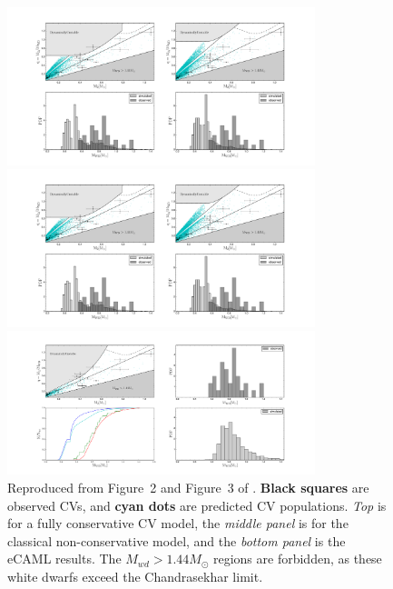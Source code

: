 \begin{figure}
    \centering
    \begin{minipage}[b]{\textwidth}
        \centering
        \includegraphics[width=0.8\textwidth,trim={22cm 12cm 0 0},clip]{figures/introduction/Schrieber_figure1.pdf}
    \end{minipage}
    \begin{minipage}[b]{\textwidth}
        \centering
        \includegraphics[width=0.8\textwidth,trim={0 12cm 22cm 0},clip]{figures/introduction/Schrieber_figure1.pdf}
    \end{minipage}
    \begin{minipage}[b]{\textwidth}
        \centering
        \includegraphics[width=0.8\textwidth,trim={0 11.5cm 24cm 0},clip]{figures/introduction/Schrieber_figure2.pdf}
    \end{minipage}
    \caption{Reproduced from Figure~2 and Figure~3 of \citet{Schreiber2016}. {\bf Black squares} are observed CVs, and {\bf cyan dots} are predicted CV populations. {\it Top} is for a fully conservative CV model, the {\it middle panel} is for the classical non-conservative model, and the {\it bottom panel} is the eCAML results. The $M_{wd} > 1.44 M_\odot$ regions are forbidden, as these white dwarfs exceed the Chandrasekhar limit.}
    \label{fig:introduction:Schreiber 2016 figure 2}
\end{figure}

